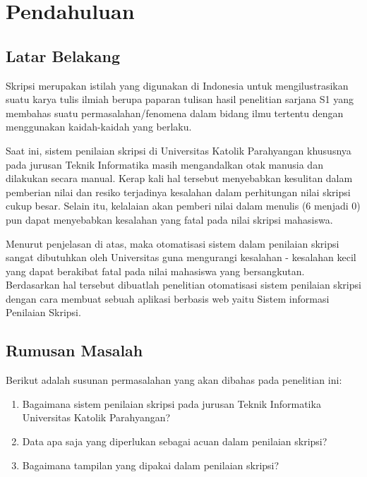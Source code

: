 \chapter{Pendahuluan}
\label{chap:pendahuluan}

\section{Latar Belakang}
\label{sec:latarBelakang}

	Skripsi merupakan istilah yang digunakan di Indonesia untuk mengilustrasikan suatu karya tulis ilmiah berupa paparan tulisan hasil penelitian sarjana S1 yang membahas suatu permasalahan/fenomena dalam bidang ilmu tertentu dengan menggunakan kaidah-kaidah yang berlaku.
	
	Saat ini, sistem penilaian skripsi di Universitas Katolik Parahyangan khususnya pada jurusan Teknik Informatika masih mengandalkan otak manusia dan dilakukan secara manual. Kerap kali hal tersebut menyebabkan kesulitan dalam pemberian nilai dan resiko terjadinya kesalahan dalam perhitungan nilai skripsi cukup besar. Selain itu, kelalaian akan pemberi nilai dalam menulis (6 menjadi 0) pun dapat menyebabkan kesalahan yang fatal pada nilai skripsi mahasiswa. 
	
	Menurut penjelasan di atas, maka otomatisasi sistem dalam penilaian skripsi sangat dibutuhkan oleh Universitas guna mengurangi kesalahan - kesalahan kecil yang dapat berakibat fatal pada nilai mahasiswa yang bersangkutan. Berdasarkan hal tersebut dibuatlah penelitian otomatisasi sistem penilaian skripsi dengan cara membuat sebuah aplikasi berbasis web yaitu Sistem informasi Penilaian Skripsi.
	
\section{Rumusan Masalah}
\label{sec: rumusanMasalah}

	Berikut adalah susunan permasalahan yang akan dibahas pada penelitian ini:
	\begin{enumerate}
		\item Bagaimana sistem penilaian skripsi pada jurusan Teknik Informatika Universitas Katolik Parahyangan?
		\item Data apa saja yang diperlukan sebagai acuan dalam penilaian skripsi?
		\item Bagaimana tampilan yang dipakai dalam penilaian skripsi?
	\end{enumerate}

